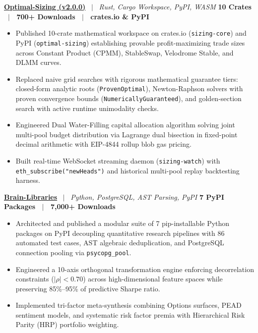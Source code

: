 \documentclass[10pt,a4paper]{article}
\begin{document}
\textbf{\href{https://github.com/Xtley001/optimal-sizing}{Optimal-Sizing (v2.0.0)}} \ $|$ \ \textit{Rust, Cargo Workspace, PyPI, WASM} \hfill \textbf{10 Crates \ $|$ \ 700+ Downloads \ $|$ \ crates.io \& PyPI}
\begin{itemize}
    \item Published 10-crate mathematical workspace on crates.io (\texttt{sizing-core}) and PyPI (\texttt{optimal-sizing}) establishing provable profit-maximizing trade sizes across Constant Product (CPMM), StableSwap, Velodrome Stable, and DLMM curves.
    \item Replaced naive grid searches with rigorous mathematical guarantee tiers: closed-form analytic roots (\texttt{ProvenOptimal}), Newton-Raphson solvers with proven convergence bounds (\texttt{NumericallyGuaranteed}), and golden-section search with active runtime unimodality checks.
    \item Engineered Dual Water-Filling capital allocation algorithm solving joint multi-pool budget distribution via Lagrange dual bisection in fixed-point decimal arithmetic with EIP-4844 rollup blob gas pricing.
    \item Built real-time WebSocket streaming daemon (\texttt{sizing-watch}) with \texttt{eth\_subscribe("newHeads")} and historical multi-pool replay backtesting harness.
\end{itemize}

\textbf{\href{https://github.com/Xtley001/brain-libraries}{Brain-Libraries}} \ $|$ \ \textit{Python, PostgreSQL, AST Parsing, PyPI} \hfill \textbf{7 PyPI Packages \ $|$ \ 7,000+ Downloads}
\begin{itemize}
    \item Architected and published a modular suite of 7 pip-installable Python packages on PyPI decoupling quantitative research pipelines with 86 automated test cases, AST algebraic deduplication, and PostgreSQL connection pooling via \texttt{psycopg\_pool}.
    \item Engineered a 10-axis orthogonal transformation engine enforcing decorrelation constraints ($|\rho| < 0.70$) across high-dimensional feature spaces while preserving 85\%--95\% of predictive Sharpe ratio.
    \item Implemented tri-factor meta-synthesis combining Options surfaces, PEAD sentiment models, and systematic risk factor premia with Hierarchical Risk Parity (HRP) portfolio weighting.
\end{itemize}

\end{document}
